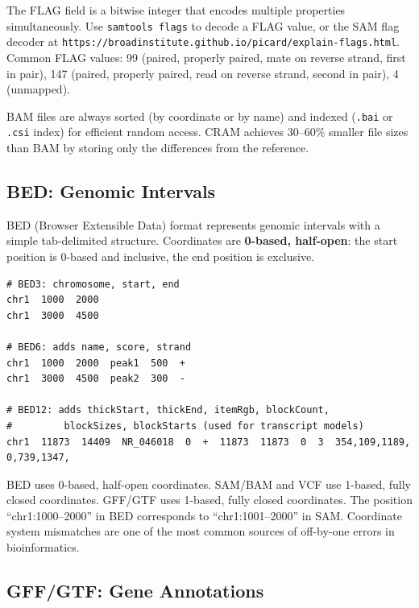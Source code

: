 \begin{warningbox}[title={SAM FLAG Field}]
The FLAG field is a bitwise integer that encodes multiple properties simultaneously. Use \texttt{samtools flags} to decode a FLAG value, or the SAM flag decoder at \texttt{https://broadinstitute.github.io/picard/explain-flags.html}. Common FLAG values: 99 (paired, properly paired, mate on reverse strand, first in pair), 147 (paired, properly paired, read on reverse strand, second in pair), 4 (unmapped).
\end{warningbox}

BAM files are always sorted (by coordinate or by name) and indexed (\texttt{.bai} or \texttt{.csi} index) for efficient random access. CRAM achieves 30--60\% smaller file sizes than BAM by storing only the differences from the reference.

\subsection{BED: Genomic Intervals}
\label{subsec:bioinf:bed}

BED (Browser Extensible Data) format represents genomic intervals with a simple tab-delimited structure. Coordinates are \textbf{0-based, half-open}: the start position is 0-based and inclusive, the end position is exclusive.

\begin{lstlisting}[caption={BED format variants (BED3, BED6, BED12).},label=lst:bed]
# BED3: chromosome, start, end
chr1  1000  2000
chr1  3000  4500

# BED6: adds name, score, strand
chr1  1000  2000  peak1  500  +
chr1  3000  4500  peak2  300  -

# BED12: adds thickStart, thickEnd, itemRgb, blockCount,
#         blockSizes, blockStarts (used for transcript models)
chr1  11873  14409  NR_046018  0  +  11873  11873  0  3  354,109,1189,  0,739,1347,
\end{lstlisting}

\begin{warningbox}[title={Coordinate Systems}]
BED uses 0-based, half-open coordinates. SAM/BAM and VCF use 1-based, fully closed coordinates. GFF/GTF uses 1-based, fully closed coordinates. The position ``chr1:1000--2000'' in BED corresponds to ``chr1:1001--2000'' in SAM. Coordinate system mismatches are one of the most common sources of off-by-one errors in bioinformatics.
\end{warningbox}

\subsection{GFF/GTF: Gene Annotations}
\label{subsec:bioinf:gff}

